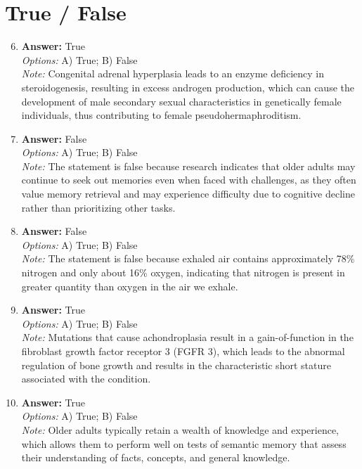 \documentclass[12pt]{article}
\begin{document}
\section*{True / False}
\begin{enumerate}[label=\arabic*.]
\setcounter{enumi}{5}
\item \textbf{Answer:} True
\\ \textit{Options:} A) True; B) False
\\ \textit{Note:} Congenital adrenal hyperplasia leads to an enzyme deficiency in steroidogenesis, resulting in excess androgen production, which can cause the development of male secondary sexual characteristics in genetically female individuals, thus contributing to female pseudohermaphroditism.
\item \textbf{Answer:} False
\\ \textit{Options:} A) True; B) False
\\ \textit{Note:} The statement is false because research indicates that older adults may continue to seek out memories even when faced with challenges, as they often value memory retrieval and may experience difficulty due to cognitive decline rather than prioritizing other tasks.
\item \textbf{Answer:} False
\\ \textit{Options:} A) True; B) False
\\ \textit{Note:} The statement is false because exhaled air contains approximately 78\% nitrogen and only about 16\% oxygen, indicating that nitrogen is present in greater quantity than oxygen in the air we exhale.
\item \textbf{Answer:} True
\\ \textit{Options:} A) True; B) False
\\ \textit{Note:} Mutations that cause achondroplasia result in a gain-of-function in the fibroblast growth factor receptor 3 (FGFR 3), which leads to the abnormal regulation of bone growth and results in the characteristic short stature associated with the condition.
\item \textbf{Answer:} True
\\ \textit{Options:} A) True; B) False
\\ \textit{Note:} Older adults typically retain a wealth of knowledge and experience, which allows them to perform well on tests of semantic memory that assess their understanding of facts, concepts, and general knowledge.
\end{enumerate}
\end{document}
